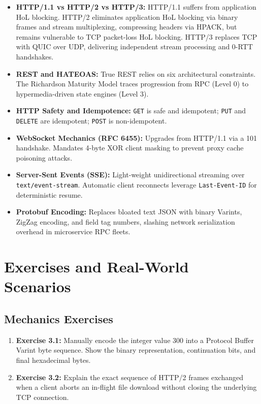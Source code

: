 \begin{itemize}[leftmargin=15pt]
  \item \textbf{HTTP/1.1 vs HTTP/2 vs HTTP/3:} HTTP/1.1 suffers from application HoL blocking. HTTP/2 eliminates application HoL blocking via binary frames and stream multiplexing, compressing headers via HPACK, but remains vulnerable to TCP packet-loss HoL blocking. HTTP/3 replaces TCP with QUIC over UDP, delivering independent stream processing and 0-RTT handshakes.
  \item \textbf{REST and HATEOAS:} True REST relies on six architectural constraints. The Richardson Maturity Model traces progression from RPC (Level 0) to hypermedia-driven state engines (Level 3).
  \item \textbf{HTTP Safety and Idempotence:} \texttt{GET} is safe and idempotent; \texttt{PUT} and \texttt{DELETE} are idempotent; \texttt{POST} is non-idempotent.
  \item \textbf{WebSocket Mechanics (RFC 6455):} Upgrades from HTTP/1.1 via a 101 handshake. Mandates 4-byte XOR client masking to prevent proxy cache poisoning attacks.
  \item \textbf{Server-Sent Events (SSE):} Light-weight unidirectional streaming over \texttt{text/event-stream}. Automatic client reconnects leverage \texttt{Last-Event-ID} for deterministic resume.
  \item \textbf{Protobuf Encoding:} Replaces bloated text JSON with binary Varints, ZigZag encoding, and field tag numbers, slashing network serialization overhead in microservice RPC fleets.
\end{itemize}

\section{Exercises and Real-World Scenarios}

\subsection{Mechanics Exercises}
\begin{enumerate}
  \item \textbf{Exercise 3.1:} Manually encode the integer value $300$ into a Protocol Buffer Varint byte sequence. Show the binary representation, continuation bits, and final hexadecimal bytes.
  \item \textbf{Exercise 3.2:} Explain the exact sequence of HTTP/2 frames exchanged when a client aborts an in-flight file download without closing the underlying TCP connection.
\end{enumerate}

